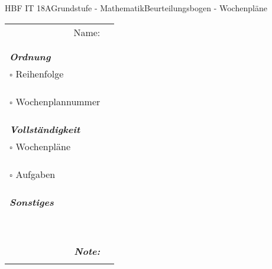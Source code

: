 \documentclass[oneside,openany,headings=optiontotoc,12pt,numbers=noenddot]{scrreprt}
\begin{document}
	\begin{worksheet}{HBF IT 18A}{Grundstufe - Mathematik}{Beurteilungsbogen - Wochenpläne}
		\begin{framed}
			\noindent
			\begin{tabularx}{\textwidth}{lX}
				\multicolumn{1}{r}{Name:}\\
				\cline{2-2}\\
				\\
				\textit{\textbf{Ordnung}}\\
				\indent $\square$ Reihenfolge & \\
				\cline{2-2}\\
				\\
				\cline{2-2}\\
				\indent $\square$ Wochenplannummer & \\
				\cline{2-2}\\
				\\
				\cline{2-2}\\
				\textit{\textbf{Vollständigkeit}}\\
				\indent $\square$ Wochenpläne & \\
				\cline{2-2}\\
				\\
				\cline{2-2}\\
				\indent $\square$ Aufgaben & \\
				\cline{2-2}\\
				\\
				\cline{2-2}\\
				\textit{\textbf{Sonstiges}}\\
				\cline{2-2}\\
				\multicolumn{2}{l}{}\\
				\hline
				\multicolumn{2}{l}{}\\
				\multicolumn{2}{l}{}\\
				\hline
				\multicolumn{2}{l}{}\\
				\multicolumn{2}{l}{}\\
				\hline
				\multicolumn{2}{l}{}\\
				\multicolumn{2}{l}{}\\
				\hline
				\multicolumn{2}{l}{}\\
				\multicolumn{1}{r}{\textit{\textbf{Note:}}}\\
				\cline{2-2}\\
			\end{tabularx}
		\end{framed}
	\end{worksheet}
\end{document}
